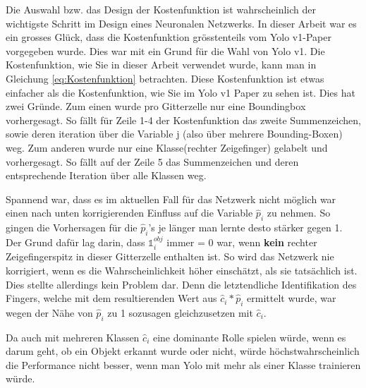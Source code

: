 Die Auswahl bzw. das Design der Kostenfunktion ist wahrscheinlich der wichtigste Schritt im Design eines Neuronalen Netzwerks. 
In dieser Arbeit war es ein grosses Glück, dass die Kostenfunktion grösstenteils vom Yolo v1-Paper \cite{yolo} vorgegeben wurde.
Dies war mit ein Grund für die Wahl von Yolo v1.
Die Kostenfunktion, wie Sie in dieser Arbeit verwendet wurde, kann man in Gleichung \ref{eq:Kostenfunktion} betrachten. 
Diese Kostenfunktion ist etwas einfacher als die Kostenfunktion, wie Sie im Yolo v1 Paper zu sehen ist. 
Dies hat zwei Gründe. 
Zum einen wurde pro Gitterzelle nur eine Boundingbox vorhergesagt. 
So fällt für Zeile 1-4 der Kostenfunktion das zweite Summenzeichen, sowie deren iteration über die Variable j (also über mehrere Bounding-Boxen) weg. 
Zum anderen wurde nur eine Klasse(rechter Zeigefinger) gelabelt und vorhergesagt.
So fällt auf der Zeile 5 das Summenzeichen und deren entsprechende Iteration über alle Klassen weg.

Spannend war, dass es im aktuellen Fall für das Netzwerk nicht möglich war einen nach unten korrigierenden Einfluss auf die Variable $\hat{p}_i$ zu nehmen.
So gingen die Vorhersagen für die $\hat{p}_i$'s je länger man lernte desto stärker gegen 1.  
Der Grund dafür lag darin, dass $\mathds{1}_{i}^{obj}$ immer = 0 war, wenn \textbf{kein} rechter Zeigefingerspitz in dieser Gitterzelle enthalten ist.
So wird das Netzwerk nie korrigiert, wenn es die Wahrscheinlichkeit höher einschätzt, als sie tatsächlich ist. 
Dies stellte allerdings kein Problem dar. 
Denn die letztendliche Identifikation des Fingers, welche mit dem resultierenden Wert aus $\hat{c}_i * \hat{p}_i$ ermittelt wurde, war wegen der Nähe von $\hat{p}_i$ zu 1 sozusagen gleichzusetzen mit $\hat{c}_i$.

Da auch mit mehreren Klassen $\hat{c}_i$ eine dominante Rolle spielen würde, wenn es darum geht, ob ein Objekt erkannt wurde oder nicht, würde höchstwahrscheinlich die Performance nicht besser, wenn man Yolo mit mehr als einer Klasse trainieren würde.






 


